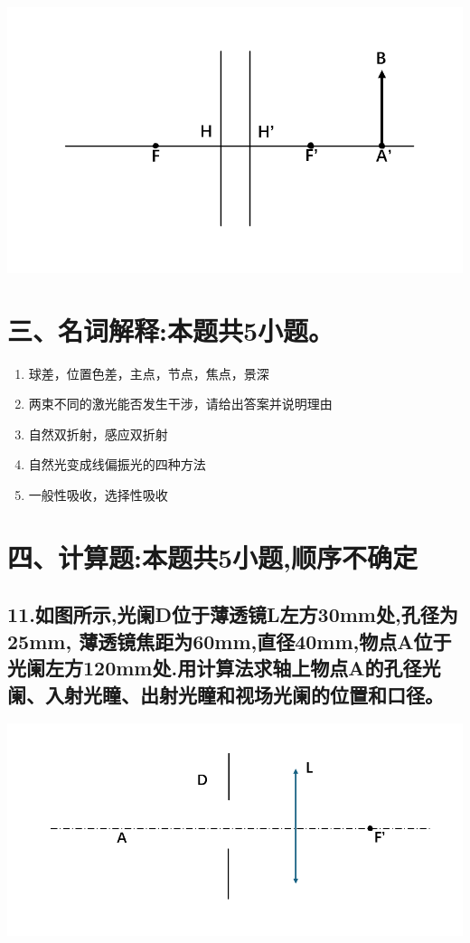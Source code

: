 \documentclass[11pt,a4paper]{article}
\begin{document}
\begin{itemize}
        \includegraphics[scale=0.2]{4.png}%
    \end{itemize}
    \section*{三、名词解释:本题共5小题。}
    \begin{enumerate}
        \vspace{0mm}
        \item 球差，位置色差，主点，节点，焦点，景深
        \vspace{0mm}
        \item 两束不同的激光能否发生干涉，请给出答案并说明理由
        \vspace{0mm}
        \item 自然双折射，感应双折射
        \vspace{0mm}
        \item 自然光变成线偏振光的四种方法
        \vspace{0mm}
        \item 一般性吸收，选择性吸收
    \end{enumerate}
    \section*{四、计算题:本题共5小题,顺序不确定}
    \subsection*{11.如图所示,光阑D位于薄透镜L左方30mm处,孔径为25mm,
    薄透镜焦距为60mm,直径40mm,物点A位于光阑左方120mm处.用计算法求轴上物点A的孔径光阑、入射光瞳、出射光瞳和视场光阑的位置和口径。}
    \includegraphics[scale=0.3]{5.png}
    \vspace{20mm}
\end{document}
